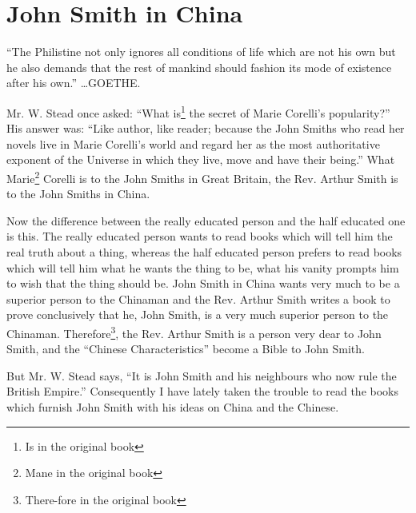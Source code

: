 \chapter{John Smith in China}
{ \scriptsize ``The Philistine not only ignores all conditions of life which are not his own but he also demands that the rest of mankind should fashion its mode of existence after his own.''\cite{num24} \dots GOETHE.}

Mr. W. Stead once asked: ``What is\footnote{Is in the original book} the secret of Marie Corelli's popularity?'' His answer was: ``Like author, like reader; because the John Smiths who read her novels live in Marie Corelli's world and regard her as the most authoritative exponent of the Universe in which they live, move and have their being.''
What Marie\footnote{Mane in the original book} Corelli is to the John Smiths in Great Britain, the Rev. Arthur Smith is to the John Smiths in China.

Now the difference between the really educated person and the half educated one is this.
The really educated person wants to read books which will tell him the real truth about a thing, whereas the half educated person prefers to read books which will tell him what he wants the thing to be, what his vanity prompts him to wish that the thing should be.
John Smith in China wants very much to be a superior person to the Chinaman and the Rev. Arthur Smith writes a book to prove conclusively that he, John Smith, is a very much superior person to the Chinaman.
Therefore\footnote{There-fore in the original book}, the Rev. Arthur Smith is a person very dear to John Smith, and the ``Chinese Characteristics'' become a Bible to John Smith.

But Mr. W. Stead says, ``It is John Smith and his neighbours who now rule the British Empire.''
Consequently I have lately taken the trouble to read the books which furnish John Smith with his ideas on China and the Chinese.


